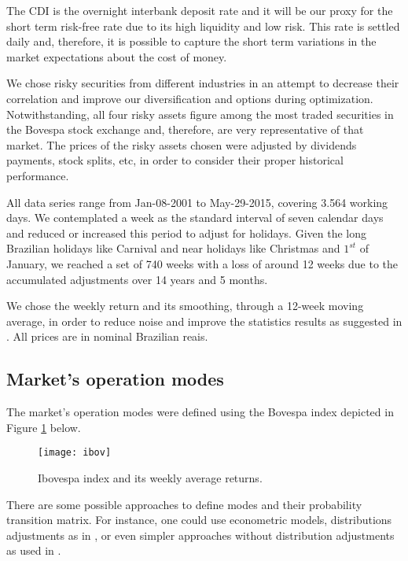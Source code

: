 The CDI is the overnight interbank deposit rate and it will be our proxy for the short term risk-free rate due to its high liquidity and low risk. This rate is settled daily and, therefore, it is possible to capture the short term variations in the market expectations about the cost of money.

We chose risky securities from different industries in an attempt to decrease their correlation and improve our diversification and options during optimization. Notwithstanding, all four risky assets figure among the most traded securities in the Bovespa stock exchange and, therefore, are very representative of that market. The prices of the risky assets chosen were adjusted by dividends payments, stock splits, etc, in order to consider their proper historical performance.

All data series range from Jan-08-2001 to May-29-2015, covering 3.564 working days. We contemplated a week as the standard interval of seven calendar days and reduced or increased this period to adjust for holidays. Given the long Brazilian holidays like Carnival and near holidays like Christmas and $1^{st}$ of January, we reached a set of 740 weeks with a loss of around 12 weeks due to the accumulated adjustments over 14 years and 5 months.

We chose the weekly return and its smoothing, through a 12-week moving average, in order to reduce noise and improve the statistics results as suggested in \cite{doe0000}. All prices are in nominal Brazilian reais.

\subsection{Market's operation modes} \label{ss2}

The market's operation modes were defined using the Bovespa index depicted in Figure \ref{fig:ibovespa} below.
%
\begin{figure} [h!]
    \caption{Ibovespa index and its weekly average returns.}
    \centering
    \texttt{[image: ibov]}
    \label{fig:ibovespa}
\end{figure}

There are some possible approaches to define modes and their probability transition matrix. For instance, one could use econometric models, distributions adjustments as in \cite{doe0000}, or even simpler approaches without distribution adjustments as used in \cite{doe0000}.

